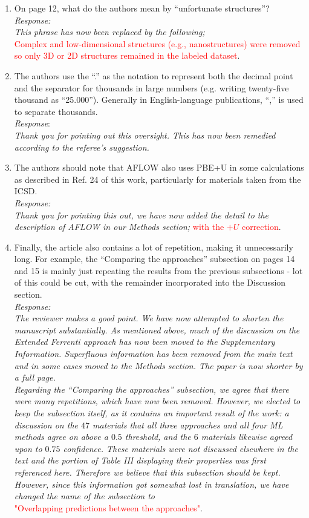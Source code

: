 \documentclass[11pt, a4paper]{letter} %
\newcommand{\mrk}[1]{\textcolor{red}{#1}}
\begin{document}
\begin{enumerate}
    \item On page 12, what do the authors mean by “unfortunate structures”? \\ 
    \textit{Response:} \\ 
    \textit{This phrase has now been replaced by the following;} \\ 
    \mrk{Complex and low-dimensional  structures (e.g., nanostructures) were removed so only 3D or 2D structures remained in the labeled dataset}. 
    \item The authors use the “.” as the notation to represent both the decimal point and the separator for thousands in large numbers (e.g. writing twenty-five thousand as “25.000”). Generally in English-language publications, “,” is used to separate thousands. \\ 
    \textit{Response}: \\
    \textit{Thank you for pointing out this oversight. This has now been remedied according to the referee's suggestion. } 
    \item The authors should note that AFLOW also uses PBE+U in some calculations as described in Ref. 24 of this work, particularly for materials taken from the ICSD. \\
    \textit{Response:} \\ 
    \textit{Thank you for pointing this out, we have now added the detail to the description of AFLOW in our Methods section;} \mrk{with the $+U$ correction}.
    \item Finally, the article also contains a lot of repetition, making it unnecessarily long. For example, the “Comparing the approaches” subsection on pages 14 and 15 is mainly just repeating the results from the previous subsections - lot of this could be cut, with the remainder incorporated into the Discussion section. \\ 
    \textit{Response:} \\ 
    \textit{The reviewer makes a good point. We have now attempted to shorten the manuscript substantially. As mentioned above, much of the discussion on the Extended Ferrenti approach has now been moved to the Supplementary Information. Superfluous information has been removed from the main text and in some cases moved to the Methods section. The paper is now shorter by a full page.} \\ 
    \textit{Regarding the “Comparing the approaches” subsection, we agree that there were many repetitions, which have now been removed. However, we elected to keep the subsection itself, as it  contains an important result of the work: a discussion on the $47$ materials that all three approaches and all four ML methods agree on above a $0.5$ threshold, and the $6$ materials likewise agreed upon to $0.75$ confidence. These materials were not discussed elsewhere in the text and the portion of Table III displaying their properties was first referenced here. Therefore we believe that this subsection should be kept. However, since this information got somewhat lost in translation, we have changed the name of the subsection to} \\ 
    \mrk{"Overlapping predictions between the approaches"}. 
\end{enumerate}
\end{document}
